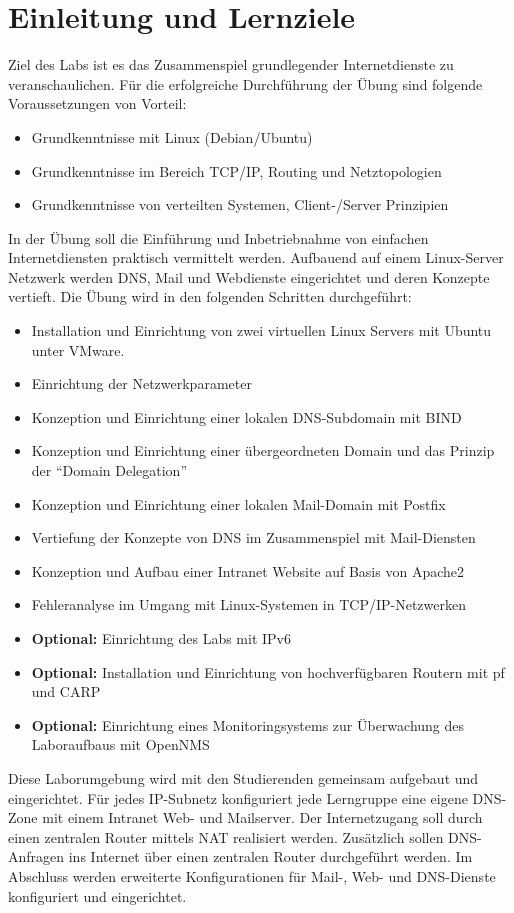 \section{Einleitung und Lernziele}
Ziel des Labs ist es das Zusammenspiel grundlegender Internetdienste zu
veranschaulichen. Für die erfolgreiche Durchführung der Übung sind folgende
Voraussetzungen von Vorteil:
\begin{itemize}
  \item Grundkenntnisse mit Linux (Debian/Ubuntu)
  \item Grundkenntnisse im Bereich TCP/IP, Routing und Netztopologien
  \item Grundkenntnisse von verteilten Systemen, Client-/Server Prinzipien
\end{itemize}

In der Übung soll die Einführung und Inbetriebnahme von einfachen
Internetdiensten praktisch vermittelt werden. Aufbauend auf einem Linux-Server
Netzwerk werden DNS, Mail und Webdienste eingerichtet und deren Konzepte
vertieft. Die Übung wird in den folgenden Schritten durchgeführt:
\begin{itemize}
  \item Installation und Einrichtung von zwei virtuellen Linux Servers mit
  Ubuntu unter VMware.
  \item Einrichtung der Netzwerkparameter
  \item Konzeption und Einrichtung einer lokalen DNS-Subdomain mit BIND
  \item Konzeption und Einrichtung einer übergeordneten Domain und das Prinzip
  der "`Domain Delegation"'
  \item Konzeption und Einrichtung einer lokalen Mail-Domain mit Postfix
  \item Vertiefung der Konzepte von DNS im Zusammenspiel mit Mail-Diensten
  \item Konzeption und Aufbau einer Intranet Website auf Basis von Apache2
  \item Fehleranalyse im Umgang mit Linux-Systemen in TCP/IP-Netzwerken
  \item {\bf Optional:} Einrichtung des Labs mit IPv6
  \item {\bf Optional:} Installation und Einrichtung von hochverfügbaren Routern
  mit pf und CARP
  \item {\bf Optional:} Einrichtung eines Monitoringsystems zur Überwachung des
  Laboraufbaus mit OpenNMS
\end{itemize}

Diese Laborumgebung wird mit den Studierenden gemeinsam aufgebaut und
eingerichtet. Für jedes IP-Subnetz konfiguriert jede Lerngruppe eine eigene
DNS-Zone mit einem Intranet Web- und Mailserver. Der Internetzugang soll durch
einen zentralen Router mittels NAT realisiert werden. Zusätzlich sollen
DNS-Anfragen ins Internet über einen zentralen Router durchgeführt werden. Im
Abschluss werden erweiterte Konfigurationen für Mail-, Web- und DNS-Dienste
konfiguriert und eingerichtet.

